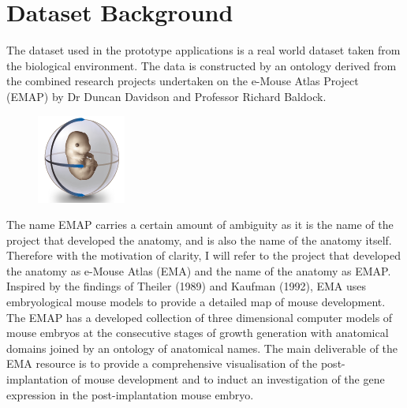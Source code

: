 \chapter{Dataset Background}
The dataset used in the prototype applications is a real world dataset taken from the biological environment. The data is constructed by an ontology derived from the combined research projects undertaken on the e-Mouse Atlas Project (EMAP) by Dr Duncan Davidson and Professor Richard Baldock.\begin{figure}\includegraphics[width=0.9\linewidth]{images/ema_logo}\end{figure} The name EMAP carries a certain amount of ambiguity as it is the name of the project that developed the anatomy, and is also the name of the anatomy itself. Therefore with the motivation of clarity, I will refer to the project that developed the anatomy as e-Mouse Atlas (EMA) and the name of the anatomy as EMAP. Inspired by the findings of Theiler (1989) and Kaufman (1992), EMA uses embryological mouse models to provide a detailed map of mouse development. The EMAP has a developed collection of three dimensional computer models of mouse embryos at the consecutive stages of growth generation with anatomical domains joined by an ontology of anatomical names. The main deliverable of the EMA resource is to provide a comprehensive visualisation of the post-implantation of mouse development and to induct an investigation of the gene expression in the post-implantation mouse embryo.

